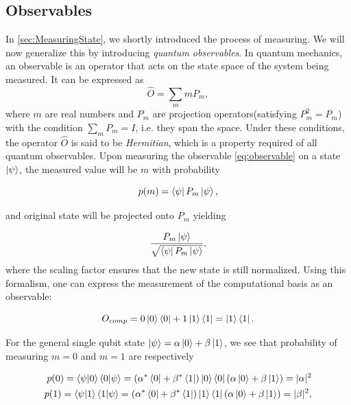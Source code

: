 \subsection{Observables}\label{sec:Observables}
In \autoref{sec:MeasuringState}, we shortly introduced the process of measuring. We will now generalize this by introducing \emph{quantum observables}. In quantum mechanics, an observable is an operator that acts on the state space of the system being measured. It can be expressed as
\begin{equation}\label{eq:observable}
    \hat{O} = \sum_m m P_m,
\end{equation}
where $m$ are real numbers and $P_m$ are projection operators(satisfying $P_m^2 = P_m$) with the condition $\sum_m P_m = I$, i.e. they span the space. Under these conditions, the operator $\hat{O}$ is said to be \emph{Hermitian}, which is a property required of all quantum observables. Upon measuring the observable \autoref{eq:observable} on a state $\ket{\psi}$, the measured value will be $m$ with probability 

\begin{equation}
    p(m) = \bra{\psi}P_m\ket{\psi},
\end{equation}

and original state will be projected onto $P_m$ yielding 

\begin{equation}
    \frac{P_m\ket{\psi}}{\sqrt{\bra{\psi}P_m\ket{\psi}}},
\end{equation}
where the scaling factor ensures that the new state is still normalized. Using this formalism, one can express the measurement of the computational basis as an observable:

\begin{equation}
    O_{comp} = 0\ket{0}\bra{0} + 1\ket{1}\bra{1} = \ket{1}\bra{1}.
\end{equation}

For the general single qubit state $\ket{\psi} = \alpha \ket{0} + \beta \ket{1}$, we see that probability of measuring $m=0$ and $m=1$ are respectively

\begin{equation}
\begin{aligned}
    p(0) = \bra{\psi} \ket{0}\bra{0} \ket{\psi} = (\alpha^* \bra{0} + \beta^* \bra{1}) \ket{0}\bra{0} (\alpha \ket{0} + \beta \ket{1}) = |\alpha|^2\\
    p(1) = \bra{\psi} \ket{1}\bra{1} \ket{\psi} = (\alpha^* \bra{0} + \beta^* \bra{1}) \ket{1}\bra{1} (\alpha \ket{0} + \beta \ket{1}) = |\beta|^2,
\end{aligned}
\end{equation}

